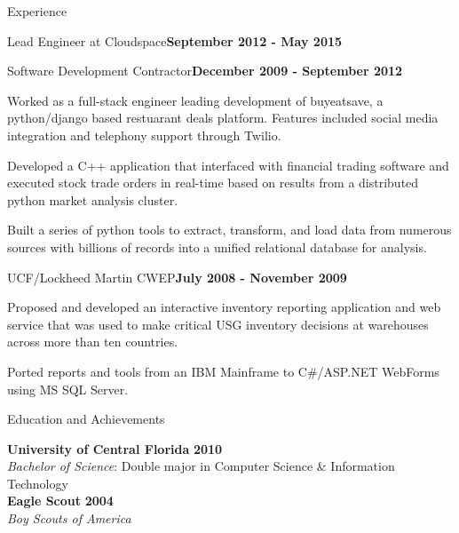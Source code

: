 \documentclass{resume} %
\begin{document}
\begin{rSection}{Experience}
\begin{rSubsection}{Lead Engineer at Cloudspace}{\bf September 2012 - May 2015}{}{}
\end{rSubsection}


\begin{rSubsection}{Software Development Contractor}{\bf December 2009 - September 2012}{}{}

\item Worked as a full-stack engineer leading development of buyeatsave, a python/django based restuarant deals platform.  Features included social media integration and telephony support through Twilio.
\item Developed a C++ application that interfaced with financial trading software and executed stock trade orders in real-time based on results from a distributed python market analysis cluster.
\item Built a series of python tools to extract, transform, and load data from numerous sources with billions of records into a unified relational database for analysis.


\end{rSubsection}


\begin{rSubsection}{UCF/Lockheed Martin CWEP}{\bf July 2008 - November 2009}{}{}

\item Proposed and developed an interactive inventory reporting application and web service that was used to make critical USG inventory decisions at warehouses across more than ten countries.
\item Ported reports and tools from an IBM Mainframe to C\#/ASP.NET WebForms using MS SQL Server.

\end{rSubsection}


\end{rSection}


\begin{rSection}{Education and Achievements}

{\bf University of Central Florida} \hfill {\bf 2010} \\ 
\textit{Bachelor of Science}: Double major in Computer Science \& Information Technology \\
{\bf Eagle Scout} \hfill {\bf 2004} \\ 
\textit{Boy Scouts of America} \\
\end{rSection}
\end{document}
